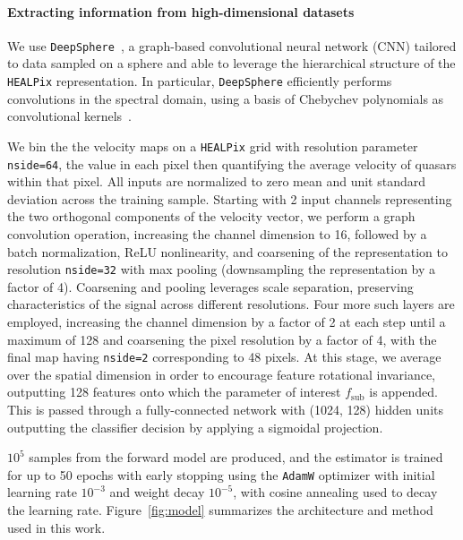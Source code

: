 \documentclass[]{article}
\begin{document}
\paragraph{Extracting information from high-dimensional datasets} We use \texttt{DeepSphere}~\cite{2020arXiv201215000D,Perraudin:2018rbt}, a graph-based convolutional neural network (CNN) tailored to data sampled on a sphere and able to leverage the hierarchical structure of the \texttt{HEALPix} representation. In particular, \texttt{DeepSphere} efficiently performs convolutions in the spectral domain, using a basis of Chebychev polynomials as convolutional kernels~\cite{2016arXiv160609375D}. 

We bin the the velocity maps on a \texttt{HEALPix} grid with resolution parameter \texttt{nside=64}, the value in each pixel then quantifying the average velocity of quasars within that pixel. All inputs are normalized to zero mean and unit standard deviation across the training sample. Starting with 2 input channels representing the two orthogonal components of the velocity vector, we perform a graph convolution operation, increasing the channel dimension to 16, followed by a batch normalization, ReLU nonlinearity, and coarsening of the representation to resolution \texttt{nside=32} with max pooling (downsampling the representation by a factor of 4). Coarsening and pooling leverages scale separation, preserving characteristics of the signal across different resolutions. Four more such layers are employed, increasing the channel dimension by a factor of 2 at each step until a maximum of 128 and coarsening the pixel resolution by a factor of 4, with the final map having \texttt{nside=2} corresponding to 48 pixels. At this stage, we average over the spatial dimension in order to encourage feature rotational invariance, outputting 128 features onto which the parameter of interest $f_\mathrm{sub}$ is appended. This is passed through a fully-connected network with (1024, 128) hidden units outputting the classifier decision by applying a sigmoidal projection.

$10^5$ samples from the forward model are produced, and the estimator is trained for up to 50 epochs with early stopping using the \texttt{AdamW} optimizer with initial learning rate $10^{-3}$ and weight decay $10^{-5}$, with cosine annealing used to decay the learning rate. Figure~\ref{fig:model} summarizes the architecture and method used in this work.

\end{document}
